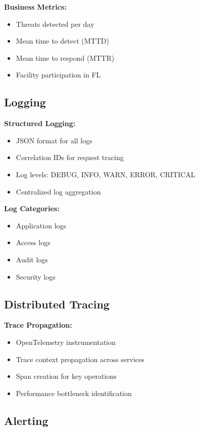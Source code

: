 \documentclass[12pt,a4paper]{article}
\begin{document}
\textbf{Business Metrics:}
\begin{itemize}[leftmargin=1cm,itemsep=0pt]
    \item Threats detected per day
    \item Mean time to detect (MTTD)
    \item Mean time to respond (MTTR)
    \item Facility participation in FL
\end{itemize}

\subsection{Logging}

\textbf{Structured Logging:}
\begin{itemize}[leftmargin=1cm,itemsep=0pt]
    \item JSON format for all logs
    \item Correlation IDs for request tracing
    \item Log levels: DEBUG, INFO, WARN, ERROR, CRITICAL
    \item Centralized log aggregation
\end{itemize}

\textbf{Log Categories:}
\begin{itemize}[leftmargin=1cm,itemsep=0pt]
    \item Application logs
    \item Access logs
    \item Audit logs
    \item Security logs
\end{itemize}

\subsection{Distributed Tracing}

\textbf{Trace Propagation:}
\begin{itemize}[leftmargin=1cm,itemsep=0pt]
    \item OpenTelemetry instrumentation
    \item Trace context propagation across services
    \item Span creation for key operations
    \item Performance bottleneck identification
\end{itemize}

\subsection{Alerting}
\end{document}
